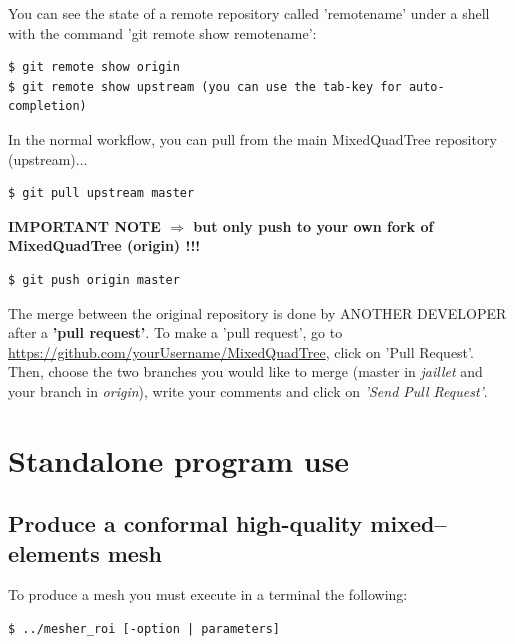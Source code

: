 \documentclass[10pt]{article}
\begin{document}
You can see the state of a remote repository called 'remotename' under a shell with the command 'git remote show remotename':
%
\begin{tcolorbox}\begin{verbatim}
$ git remote show origin
$ git remote show upstream (you can use the tab-key for auto-completion)
\end{verbatim}
\end{tcolorbox}

In the normal workflow, you can pull from the main MixedQuadTree repository (upstream)...
%
\begin{tcolorbox}\begin{verbatim}
$ git pull upstream master
\end{verbatim}
 \end{tcolorbox}

\textbf{IMPORTANT NOTE $\Rightarrow$ but only push to your own fork of MixedQuadTree (origin) !!!}

\begin{tcolorbox}\begin{verbatim}
$ git push origin master
\end{verbatim}
\end{tcolorbox}

The merge between the original repository is done by ANOTHER DEVELOPER after a \textbf{'pull request'}.
To make a 'pull request', go to \url{https://github.com/yourUsername/MixedQuadTree}, click on 'Pull Request'. Then, choose the two branches you would like to merge (master in \textit{jaillet} and your branch in \textit{origin}), write your comments and click on \textit{'Send Pull Request'}.


\section{Standalone program use}
\label{standalone}

\subsection{Produce a conformal high-quality mixed--elements mesh}
\label{s:generatemesh}

To produce a mesh you must execute in a terminal the following:
%
\begin{tcolorbox}
{\small
\begin{verbatim}
$ ../mesher_roi [-option | parameters]
\end{verbatim}
}\end{tcolorbox}
\end{document}

